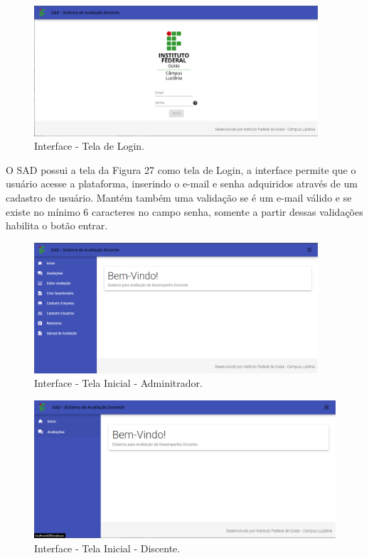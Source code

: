         \begin{figure}[h]
        \centering
        \includegraphics[width=0.94\textwidth]{./img/Login.png}
        \caption{Interface - Tela de Login.}
        \label{fig:Login}
        \end{figure}

    O SAD possui a tela da Figura 27 como tela de Login, a interface permite que o usuário acesse a plataforma, inserindo o e-mail e senha adquiridos através de um cadastro de usuário. Mantém também uma validação se é um e-mail válido e se existe no mínimo 6 caracteres no campo senha, somente a partir dessas validações habilita o botão entrar.
    
        \begin{figure}[h]
        \centering
        \includegraphics[width=0.94\textwidth]{./img/Home.png}
        \caption{Interface - Tela Inicial - Adminitrador.}
        \label{fig:Inicial}
        \end{figure}

        \begin{figure}[h]
        \centering
        \includegraphics[width=1.0\textwidth]{./img/HomeDiscente.png}
        \caption{Interface - Tela Inicial - Discente.}
        \label{fig:HomeDiscente}
        \end{figure}
        
